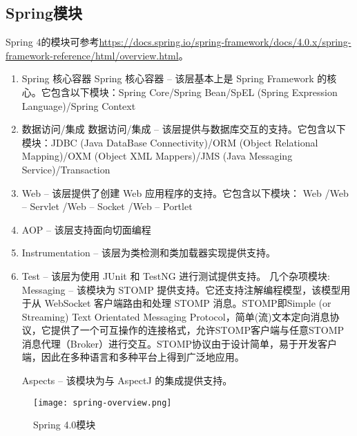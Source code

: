 \documentclass[../../../interview-questions.tex]{subfiles}
\begin{document}
\subsection{Spring模块}

Spring 4的模块可参考\url{https://docs.spring.io/spring-framework/docs/4.0.x/spring-framework-reference/html/overview.html}。

\begin{enumerate}
    \item {Spring 核心容器}
Spring 核心容器 – 该层基本上是 Spring Framework 的核心。它包含以下模块：Spring Core/Spring Bean/SpEL (Spring Expression Language)/Spring Context
    \item{数据访问/集成}
数据访问/集成 – 该层提供与数据库交互的支持。它包含以下模块：JDBC (Java DataBase Connectivity)/ORM (Object Relational Mapping)/OXM (Object XML Mappers)/JMS (Java Messaging Service)/Transaction
\item{Web – 该层提供了创建 Web 应用程序的支持。}它包含以下模块：
Web
/Web – Servlet
/Web – Socket
/Web – Portlet
\item{AOP – 该层支持面向切面编程}
\item{Instrumentation – 该层为类检测和类加载器实现提供支持。}
\item{Test – 该层为使用 JUnit 和 TestNG 进行测试提供支持。}
几个杂项模块:
Messaging – 该模块为 STOMP 提供支持。它还支持注解编程模型，该模型用于从 WebSocket 客户端路由和处理 STOMP 消息。STOMP即Simple (or Streaming) Text Orientated Messaging Protocol，简单(流)文本定向消息协议，它提供了一个可互操作的连接格式，允许STOMP客户端与任意STOMP消息代理（Broker）进行交互。STOMP协议由于设计简单，易于开发客户端，因此在多种语言和多种平台上得到广泛地应用。

Aspects – 该模块为与 AspectJ 的集成提供支持。
\end{enumerate}

\begin{figure}[htbp]
	\centering
	\texttt{[image: spring-overview.png]}
	\caption{Spring 4.0模块}
	\label{fig:springoverview}
\end{figure}
\end{document}
